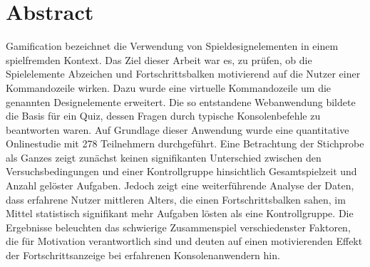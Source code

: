 \section{Abstract}
Gamification bezeichnet die Verwendung von Spieldesignelementen in einem spielfremden Kontext. Das Ziel dieser Arbeit war es, zu prüfen, ob die Spielelemente Abzeichen und Fortschrittsbalken motivierend auf die Nutzer einer Kommandozeile wirken.
Dazu wurde eine virtuelle Kommandozeile um die genannten Designelemente erweitert. Die so entstandene Webanwendung bildete die Basis für ein Quiz, dessen Fragen durch typische Konsolenbefehle zu beantworten waren.
Auf Grundlage dieser Anwendung wurde eine quantitative Onlinestudie mit 278 Teilnehmern durchgeführt. Eine Betrachtung der Stichprobe als Ganzes zeigt zunächst keinen signifikanten Unterschied zwischen den Versuchsbedingungen und einer Kontrollgruppe hinsichtlich Gesamtspielzeit und Anzahl gelöster Aufgaben. Jedoch zeigt eine weiterführende Analyse der Daten, dass erfahrene Nutzer mittleren Alters, die einen Fortschrittsbalken sahen, im Mittel statistisch signifikant mehr Aufgaben lösten als eine Kontrollgruppe.
Die Ergebnisse beleuchten das schwierige Zusammenspiel verschiedenster Faktoren, die für Motivation verantwortlich sind und deuten auf einen motivierenden Effekt der Fortschrittsanzeige bei erfahrenen Konsolenanwendern hin. 